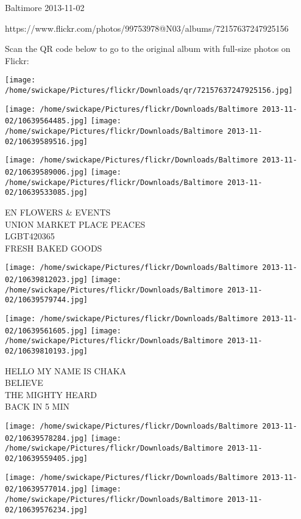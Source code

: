 \documentclass[10pt,letterpaper]{article}
\begin{document}
Baltimore 2013-11-02

https://www.flickr.com/photos/99753978@N03/albums/72157637247925156

Scan the QR code below to go to the original album with full-size photos on Flickr:

\texttt{[image: /home/swickape/Pictures/flickr/Downloads/qr/72157637247925156.jpg]}
\pagebreak

\texttt{[image: /home/swickape/Pictures/flickr/Downloads/Baltimore 2013-11-02/10639564485.jpg]}
\texttt{[image: /home/swickape/Pictures/flickr/Downloads/Baltimore 2013-11-02/10639589516.jpg]}

\texttt{[image: /home/swickape/Pictures/flickr/Downloads/Baltimore 2013-11-02/10639589006.jpg]}
\texttt{[image: /home/swickape/Pictures/flickr/Downloads/Baltimore 2013-11-02/10639533085.jpg]}

EN FLOWERS \& EVENTS\\
UNION MARKET PLACE PEACES\\
LGBT420365\\
FRESH BAKED GOODS\\
\pagebreak

\texttt{[image: /home/swickape/Pictures/flickr/Downloads/Baltimore 2013-11-02/10639812023.jpg]}
\texttt{[image: /home/swickape/Pictures/flickr/Downloads/Baltimore 2013-11-02/10639579744.jpg]}

\texttt{[image: /home/swickape/Pictures/flickr/Downloads/Baltimore 2013-11-02/10639561605.jpg]}
\texttt{[image: /home/swickape/Pictures/flickr/Downloads/Baltimore 2013-11-02/10639810193.jpg]}

HELLO MY NAME IS CHAKA\\
BELIEVE\\
THE MIGHTY HEARD\\
BACK IN 5 MIN\\
\pagebreak

\texttt{[image: /home/swickape/Pictures/flickr/Downloads/Baltimore 2013-11-02/10639578284.jpg]}
\texttt{[image: /home/swickape/Pictures/flickr/Downloads/Baltimore 2013-11-02/10639559405.jpg]}

\texttt{[image: /home/swickape/Pictures/flickr/Downloads/Baltimore 2013-11-02/10639577014.jpg]}
\texttt{[image: /home/swickape/Pictures/flickr/Downloads/Baltimore 2013-11-02/10639576234.jpg]}
\end{document}
